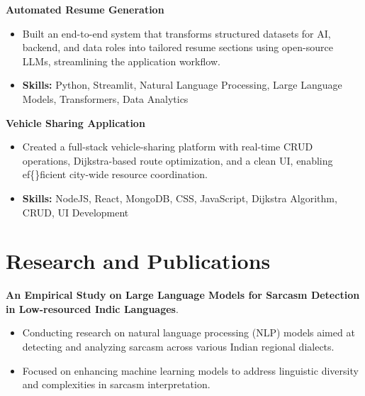 \documentclass[a4paper,11pt]{article}
\begin{document}
\vspace{1mm}
  \textbf{Automated Resume Generation  }
\vspace{-1.5mm} %
\begin{itemize}
  \item Built an end-to-end system that transforms structured datasets for AI, backend, and data roles into tailored resume sections using open-source LLMs, streamlining the application workflow.
\vspace{-3mm}
  \item \textbf{Skills:} Python, Streamlit, Natural Language Processing, Large Language Models, Transformers, Data Analytics
\end{itemize}


\vspace{1mm}
   \textbf{Vehicle Sharing Application }
\vspace{-1.5mm} %
\begin{itemize}
  \item Created a full-stack vehicle-sharing platform with real-time CRUD operations, Dijkstra-based route optimization, and a clean UI, enabling ef\{\}ficient city-wide resource coordination.
\vspace{-3mm}
  \item \textbf{Skills:} NodeJS, React, MongoDB, CSS, JavaScript, Dijkstra Algorithm, CRUD, UI Development
\end{itemize}



\section{\textbf{Research and Publications} \hfill }
\vspace{1mm}
  \textbf{An Empirical Study on Large Language Models for Sarcasm Detection in Low-resourced Indic Languages}.
\vspace{-1mm} %
\begin{itemize}
  \item Conducting research on natural language processing (NLP) models aimed at detecting and analyzing sarcasm across various Indian regional dialects.
\vspace{-3mm}
  \item Focused on enhancing machine learning models to address linguistic diversity and complexities in sarcasm interpretation.
\end{itemize}
\end{document}

